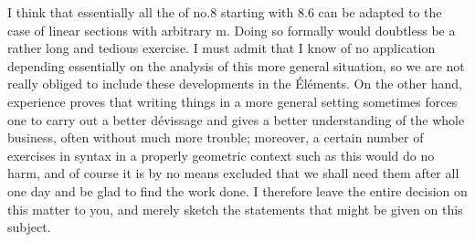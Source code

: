 

I think that essentially all the  of no.8 starting
with 8.6 can  be adapted to the case of linear sections with
arbitrary m. Doing so formally would doubtless be a rather long
and tedious exercise. I must admit that I know of no application
depending essentially on the analysis of this more general
situation, so we are not really obliged to include these
developments in the Éléments. On the other hand, experience proves that
writing things in a more general setting sometimes forces one to
carry out a better dévissage and gives a better understanding of the whole business, often without much
more trouble; moreover, a certain number of exercises in syntax in a
properly geometric context such as this would do no harm, and
of course it is by no means excluded that we shall need them after all
one day and be glad to find the work done. I therefore leave
the entire decision on this matter to you, and merely sketch the
statements that might be given on this subject.


